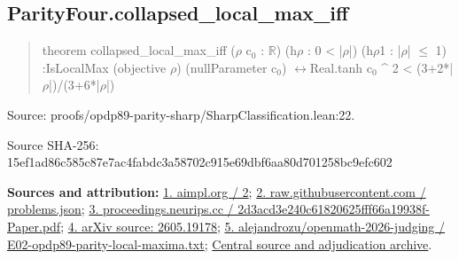 \documentclass[11pt,a4paper]{article}
\begin{document}
\begin{samepage}
\subsection{ParityFour.collapsed\_local\_max\_iff}
\begin{quote}\small\ttfamily theorem collapsed\_local\_max\_iff (\ensuremath{\rho} c\ensuremath{_0} : \ensuremath{\mathbb{R}}) (h\ensuremath{\rho} : 0 < |\ensuremath{\rho}|) (h\ensuremath{\rho}1 : |\ensuremath{\rho}| \ensuremath{\leq} 1) :\newline     IsLocalMax (objective \ensuremath{\rho}) (nullParameter c\ensuremath{_0}) \ensuremath{\leftrightarrow}\newline       Real.tanh c\ensuremath{_0} \textasciicircum{} 2 < (3+2*|\ensuremath{\rho}|)/(3+6*|\ensuremath{\rho}|)\end{quote}
{\small Source: proofs/opdp89-parity-sharp/SharpClassification.lean:22.\par}

{\small Source SHA-256: 15ef1ad86c585c87e7ac4fabdc3a58702c915e69dbf6aa80d701258bc9efc602\par}

{\small\textbf{Sources and attribution:} \href{http://aimpl.org/boltzmann/2/}{1. aimpl.org / 2}; \href{https://raw.githubusercontent.com/alejandrozu/opdp-week-math-100/main/data/problems.json}{2. raw.githubusercontent.com / problems.json}; \href{https://proceedings.neurips.cc/paper_files/paper/2002/file/2d3acd3e240c61820625fff66a19938f-Paper.pdf}{3. proceedings.neurips.cc / 2d3acd3e240c61820625fff66a19938f-Paper.pdf}; \href{https://arxiv.org/html/2605.19178}{4. arXiv source: 2605.19178}; \href{https://github.com/alejandrozu/openmath-2026-judging/blob/d0ed487f487fa7ec814ff705ab55249983fe8707/OpenMath-Judging/review/entries/E02-opdp89-parity-local-maxima.txt}{5. alejandrozu/openmath-2026-judging / E02-opdp89-parity-local-maxima.txt}; \href{https://github.com/alejandrozu/openmath-2026-judging}{Central source and adjudication archive}.\par}

\end{samepage}
\end{document}
